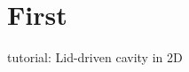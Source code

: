 \hypertarget{First-example}{\section{First}
}
tutorial\-: Lid-\/driven cavity in 2\-D


\begin{DoxyCodeInclude}
\end{DoxyCodeInclude}
 